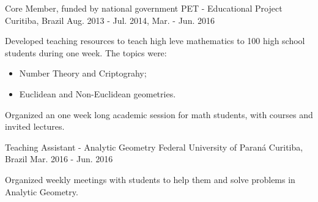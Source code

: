 

\begin{cventries}

  \cventry
    {Core Member, funded by national government} %
    {PET - Educational Project} %
    {Curitiba, Brazil} %
    {Aug. 2013 - Jul. 2014, Mar. - Jun. 2016} %
    {
      \begin{cvitems} %
        \item {Developed teaching resources to teach high leve mathematics
        to 100 high school students during one week. The topics were:
        \begin{itemize}
          \item Number Theory and Criptograhy;
          \item Euclidean and Non-Euclidean geometries.
        \end{itemize}}
        \item {Organized an one week long academic session for math students,
        with courses and invited lectures.}
      \end{cvitems}
    }

  \cventry
    {Teaching Assistant - Analytic Geometry} %
    {Federal University of Paraná} %
    {Curitiba, Brazil} %
    {Mar. 2016 - Jun. 2016} %
    {
      \begin{cvitems} %
        \item {Organized weekly meetings with students to help them and solve
        problems in Analytic Geometry.}
      \end{cvitems}
    }

\end{cventries}
